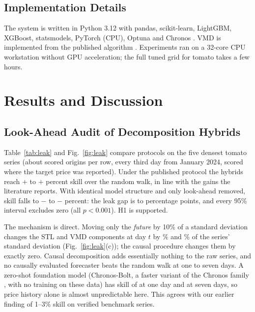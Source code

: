 \documentclass{ieeeaccess}
\begin{document}
\subsection{Implementation Details}
The system is written in Python 3.12 with pandas, scikit-learn, LightGBM, XGBoost, statsmodels, PyTorch (CPU), Optuna \cite{akiba2019} and Chronos \cite{ansari2024}. VMD is implemented from the published algorithm \cite{dragomiretskiy2014}. Experiments ran on a 32-core CPU workstation without GPU acceleration; the full tuned grid for tomato takes a few hours.

\section{Results and Discussion}
\label{sec:results}
\subsection{Look-Ahead Audit of Decomposition Hybrids}
Table~\ref{tab:leak} and Fig.~\ref{fig:leak} compare protocols on the five densest tomato series (about \LeakNOrigins{} scored origins per row, every third day from January 2024, scored where the target price was reported). Under the published protocol the hybrids reach $+$\PubLo{} to $+$\PubHi{} percent skill over the random walk, in line with the gains the literature reports. With identical model structure and only look-ahead removed, skill falls to $-$\CauLoAbs{} to $-$\CauHiAbs{} percent: the leak gap is \LeakGapLo{} to \LeakGapHi{} percentage points, and every 95\% interval excludes zero (all $p<0.001$). H1 is supported.

The mechanism is direct. Moving only the \emph{future} by 10\% of a standard deviation changes the STL and VMD components at day $t$ by \SensStl{}\% and \SensVmd{}\% of the series' standard deviation (Fig.~\ref{fig:leak}(c)); the causal procedure changes them by exactly zero. Causal decomposition adds essentially nothing to the raw series, and no causally evaluated forecaster beats the random walk at one to seven days. A zero-shot foundation model (Chronos-Bolt, a faster variant of the Chronos family \cite{ansari2024}, with no training on these data) has skill of \FoundA{} at one day and \FoundB{} at seven days, so price history alone is almost unpredictable here. This agrees with our earlier finding of 1--3\% skill on verified benchmark series.
\end{document}
